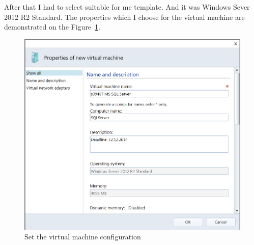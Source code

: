 \documentclass[english]{article}
\begin{document}
\newpage
After that I had to select suitable for me template. And it was Windows Sever 2012 R2 Standard. The properties which I choose for the virtual machine are demonstrated on the Figure~\ref{fig:startingConf}.
\begin{figure}[hb]
\centerline{\includegraphics[scale=0.7]{SQL/startingConf}}
\caption{Set the virtual machine configuration}
\label{fig:startingConf}
\end{figure}
\end{document}
